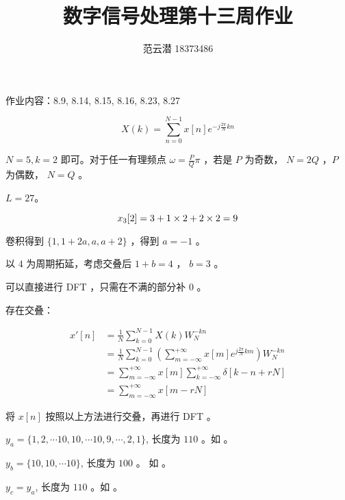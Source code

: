 \documentclass[lang=cn,11pt,a4paper,cite=authoryear]{elegantpaper}
\title{数字信号处理\quad 第十三周作业}
\author{范云潜 18373486}
\institute{微电子学院 184111 班}
\date{\zhtoday}
\begin{document}
\maketitle

作业内容：8.9, 8.14, 8.15, 8.16, 8.23, 8.27



\[X(k) = \sum_{n=0}^{N-1} x[n] e^{-j\frac{2\pi}{N} k n }\]

\(N=5, k=2\) 即可。对于任一有理频点 \(\omega = \frac{P}{Q}\pi\) ，若是 \(P\) 为奇数， \(N = 2Q\) ，\(P\) 为偶数， \(N=Q\) 。


\(L=27\)。


\[x_3[2] = 3 \time 1 + 1 \times 2 + 2 \times 2 = 9\]


卷积得到 \(\{1, 1 + 2 a, a, a + 2\}\) ，得到 \(a = -1\) 。


以 \(4\) 为周期拓延，考虑交叠后 \(1 + b = 4\) ， \(b = 3\) 。



可以直接进行 DFT ，只需在不满的部分补 \(0\) 。


存在交叠：

\[\begin{aligned}
    x'[n] &= \frac{1}{N} \sum_{k=0}^{N-1} X(k) W_N^{-k n} \\
    &= \frac{1}{N} \sum_{k=0}^{N-1} \left(\sum_{m=-\infty}^{+\infty}x[m] e^{j\frac{2\pi}{N} k m}\right) W_N^{-k n} \\ 
    &= \sum_{m=-\infty}^{+\infty} x[m] \sum_{k=-\infty}^{+\infty} \delta[k-n+rN] \\
    &= \sum_{m=-\infty}^{+\infty} x[m - r N]
\end{aligned}\]

将 \(x[n]\) 按照以上方法进行交叠，再进行 DFT 。



\(y_{a} = \{1,2,\cdots 10,10,\cdots 10,9,\cdots,2,1\}\), 长度为 \(110\) 。如  。



\(y_{b} = \{10, 10, \cdots 10\}\), 长度为 \(100\) 。
如  。




\(y_{c} = y_{a}\), 长度为 \(110\) 。如  。




\end{document}
